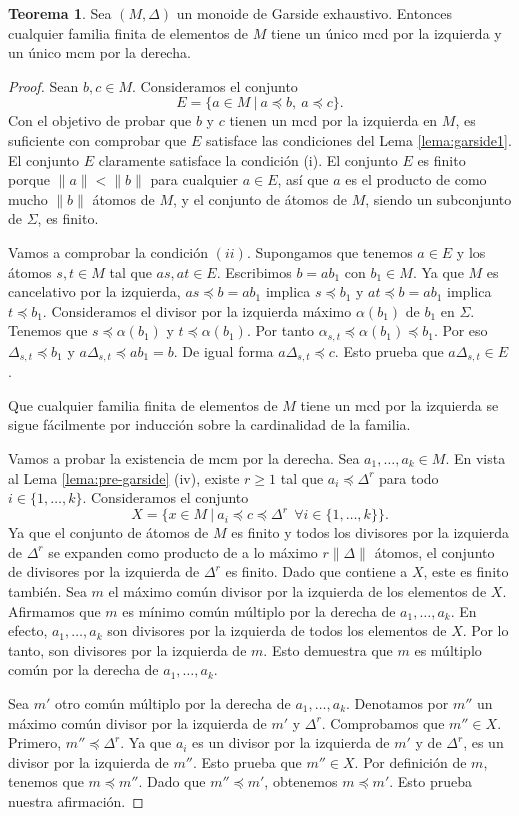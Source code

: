 \documentclass[12pt]{book}
\theoremstyle{definition}
\newtheorem{teor}{Teorema}[section]
\providecommand{\norm}[1]{\lVert#1\rVert}
\begin{document}
\begin{teor}
Sea $(M,\Delta)$ un monoide de Garside exhaustivo. Entonces cualquier familia finita de elementos de $M$ tiene un único mcd por la izquierda y un único mcm por la derecha.
\end{teor}
\begin{proof} Sean $b,c\in M$. Consideramos el conjunto
$$E=\{a\in M\ |\ a\preceq b,\ a\preceq c\}.$$
Con el objetivo de probar que $b$ y $c$ tienen un mcd por la izquierda en $M$, es suficiente con comprobar que $E$ satisface las condiciones del Lema \ref{lema:garside1}. El conjunto $E$ claramente satisface la condición (i). El conjunto $E$ es finito porque $\norm{a}<\norm{b}$ para cualquier $a\in E$, así que $a$ es el producto de como mucho $\norm{b}$ átomos de $M$, y el conjunto de átomos de $M$, siendo un subconjunto de $\Sigma$, es finito.

Vamos a comprobar la condición $(ii)$. Supongamos que tenemos $a\in E$ y los átomos $s,t\in M$ tal que $as,at\in E$. Escribimos $b=ab_1$ con $b_1\in M$. Ya que $M$ es cancelativo por la izquierda, $as\preceq b =ab_1$ implica $s\preceq b_1$ y $at\preceq b = ab_1$ implica $t\preceq b_1$. Consideramos el divisor por la izquierda máximo $\alpha(b_1)$ de $b_1$ en $\Sigma$. Tenemos que $s\preceq\alpha(b_1)$ y $t\preceq\alpha(b_1)$. Por tanto $\alpha_{s,t}\preceq \alpha(b_1)\preceq b_1$. Por eso $\Delta_{s,t}\preceq b_1$ y $a\Delta_{s,t}\preceq ab_1= b$. De igual forma $a\Delta_{s,t}\preceq c$. Esto prueba que $a\Delta_{s,t}\in E$.

Que cualquier familia finita de elementos de $M$ tiene un mcd por la izquierda se sigue fácilmente por inducción sobre la cardinalidad de la familia.

Vamos a probar la existencia de mcm por la derecha. Sea $a_1,\ldots,a_k\in M$. En vista al Lema \ref{lema:pre-garside} (iv), existe $r\geq 1$ tal que $a_i\preceq\Delta^r$ para todo $i\in\{1,\ldots,k\}$. Consideramos el conjunto
$$X=\{x\in M\ |\ a_i\preceq c\preceq\Delta^r\ \ \forall i\in\{1,\ldots,k\}\}.$$
Ya que el conjunto de átomos de $M$ es finito y todos los divisores por la izquierda de $\Delta^r$ se expanden como producto de a lo máximo $r\norm{\Delta}$ átomos, el conjunto de divisores por la izquierda de $\Delta^r$ es finito. Dado que contiene a $X$, este es finito también. Sea $m$ el máximo común divisor por la izquierda de los elementos de $X$. Afirmamos que $m$ es mínimo común múltiplo por la derecha de $a_1,\ldots,a_k$. En efecto, $a_1,\ldots,a_k$ son divisores por la izquierda de todos los elementos de $X$. Por lo tanto, son divisores por la izquierda de $m$. Esto demuestra que $m$ es múltiplo común por la derecha de $a_1,\ldots,a_k$.

Sea $m'$ otro común múltiplo por la derecha de $a_1,\ldots,a_k$. Denotamos por $m''$ un máximo común divisor por la izquierda de $m'$ y $\Delta^r$. Comprobamos que $m''\in X$. Primero, $m''\preceq\Delta^r$. Ya que $a_i$ es un divisor por la izquierda de $m'$ y de $\Delta^r$, es un divisor por la izquierda de $m''$. Esto prueba que $m''\in X$. Por definición de $m$, tenemos que $m\preceq m''$. Dado que $m''\preceq m'$, obtenemos $m\preceq m'$. Esto prueba nuestra afirmación.
\end{proof}
\end{document}
